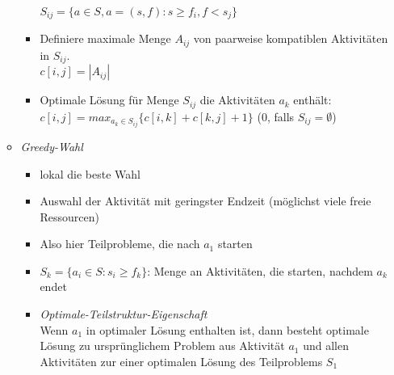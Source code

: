 \begin{itemize}
\begin{itemize}
\begin{itemize}
                                $S_{ij} = \{a \in S,a = (s,f): s \geq f_i, f < s_j\}$
                        \item Definiere maximale Menge $A_{ij}$ von paarweise kompatiblen Aktivitäten in $S_{ij}$. \\
                                $c[i,j] = |A_{ij}|$
                        \item Optimale Lösung für Menge $S_{ij}$ die Aktivitäten $a_k$ enthält: \\
                                $c[i,j] = max_{a_k\in S_{ij}}\{c[i,k] + c[k,j] + 1\}$ ($0$, falls $S_{ij} = \emptyset$)
                    \end{itemize}

                \item \textit{Greedy-Wahl}
                    \begin{itemize}
                        \item lokal die beste Wahl
                        \item Auswahl der Aktivität mit geringster Endzeit (möglichst viele freie Ressourcen)
                        \item Also hier Teilprobleme, die nach $a_1$ starten
                        \item $S_k = \{a_i \in S: s_i \geq f_k\}$: Menge an Aktivitäten, die starten, nachdem $a_k$ endet
                        \item \textit{Optimale-Teilstruktur-Eigenschaft} \\
                                Wenn $a_1$ in optimaler Lösung enthalten ist, dann besteht optimale Lösung zu ursprünglichem
                                Problem aus Aktivität $a_1$ und allen Aktivitäten zur einer optimalen Lösung des 
                                Teilproblems $S_1$
                    \end{itemize}


\end{itemize}
\end{itemize}
